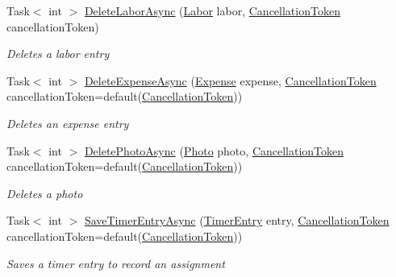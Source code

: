 \begin{DoxyCompactItemize}
Task$<$ int $>$ \hyperlink{class_field_service_1_1_data_1_1_sample_assignment_service_a13b41d67f5d74696fac4832c98b394f5}{Delete\+Labor\+Async} (\hyperlink{class_field_service_1_1_data_1_1_labor}{Labor} labor, \hyperlink{_view_models_2_assignment_view_model_8cs_aba80ec766846c61f55644fd23860cb18}{Cancellation\+Token} cancellation\+Token)
\begin{DoxyCompactList}\small\item\em Deletes a labor entry \end{DoxyCompactList}\item 
Task$<$ int $>$ \hyperlink{class_field_service_1_1_data_1_1_sample_assignment_service_a2dffdde870612a161468a31644a061ac}{Delete\+Expense\+Async} (\hyperlink{class_field_service_1_1_data_1_1_expense}{Expense} expense, \hyperlink{_view_models_2_assignment_view_model_8cs_aba80ec766846c61f55644fd23860cb18}{Cancellation\+Token} cancellation\+Token=default(\hyperlink{_view_models_2_assignment_view_model_8cs_aba80ec766846c61f55644fd23860cb18}{Cancellation\+Token}))
\begin{DoxyCompactList}\small\item\em Deletes an expense entry \end{DoxyCompactList}\item 
Task$<$ int $>$ \hyperlink{class_field_service_1_1_data_1_1_sample_assignment_service_a66e517e85d234be35d074d0111aa93b7}{Delete\+Photo\+Async} (\hyperlink{class_field_service_1_1_data_1_1_photo}{Photo} photo, \hyperlink{_view_models_2_assignment_view_model_8cs_aba80ec766846c61f55644fd23860cb18}{Cancellation\+Token} cancellation\+Token=default(\hyperlink{_view_models_2_assignment_view_model_8cs_aba80ec766846c61f55644fd23860cb18}{Cancellation\+Token}))
\begin{DoxyCompactList}\small\item\em Deletes a photo \end{DoxyCompactList}\item 
Task$<$ int $>$ \hyperlink{class_field_service_1_1_data_1_1_sample_assignment_service_acfaa9c42802ecc8bd65e1c4b5c7b3fdf}{Save\+Timer\+Entry\+Async} (\hyperlink{class_field_service_1_1_data_1_1_timer_entry}{Timer\+Entry} entry, \hyperlink{_view_models_2_assignment_view_model_8cs_aba80ec766846c61f55644fd23860cb18}{Cancellation\+Token} cancellation\+Token=default(\hyperlink{_view_models_2_assignment_view_model_8cs_aba80ec766846c61f55644fd23860cb18}{Cancellation\+Token}))
\begin{DoxyCompactList}\small\item\em Saves a timer entry to record an assignment \end{DoxyCompactList}\item 

\end{DoxyCompactItemize}
